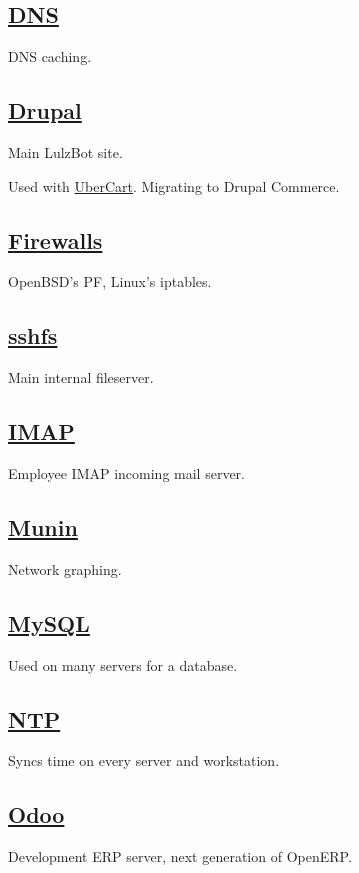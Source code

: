 \subsection{\href{http://dnsmasq.org/}{DNS}}
DNS caching.

\subsection{\href{http://www.drupal.org}{Drupal}}
Main LulzBot site.

Used with \href{http://www.ubercart.org/}{UberCart}.
Migrating to Drupal Commerce.

\subsection{\href{http://www.openbsd.org/faq/pf/}{Firewalls}}
OpenBSD's PF, Linux's iptables.

\subsection{\href{http://fuse.sourceforge.net/sshfs.html}{sshfs}}
Main internal fileserver.

\subsection{\href{http://dovecot.org/}{IMAP}}
Employee IMAP incoming mail server.

\subsection{\href{http://munin-monitoring.org/}{Munin}}
Network graphing.

\subsection{\href{http://www.mysql.org/}{MySQL}}
Used on many servers for a database.

\subsection{\href{http://support.ntp.org/}{NTP}}
Syncs time on every server and workstation.

\subsection{\href{http://www.odoo.com/}{Odoo}}
Development ERP server, next generation of OpenERP.


